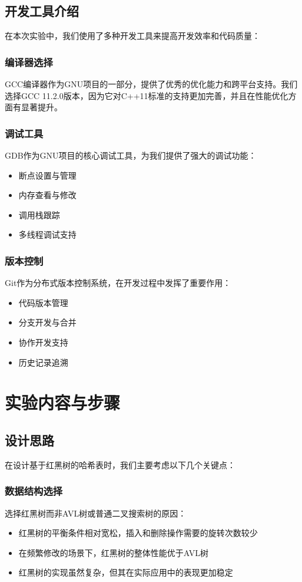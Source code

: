\documentclass[12pt,a4paper]{article}
\begin{document}
\subsection{开发工具介绍}
在本次实验中，我们使用了多种开发工具来提高开发效率和代码质量：

\subsubsection{编译器选择}
GCC编译器作为GNU项目的一部分，提供了优秀的优化能力和跨平台支持。我们选择GCC 11.2.0版本，因为它对C++11标准的支持更加完善，并且在性能优化方面有显著提升。

\subsubsection{调试工具}
GDB作为GNU项目的核心调试工具，为我们提供了强大的调试功能：
\begin{itemize}
\item 断点设置与管理
\item 内存查看与修改
\item 调用栈跟踪
\item 多线程调试支持
\end{itemize}

\subsubsection{版本控制}
Git作为分布式版本控制系统，在开发过程中发挥了重要作用：
\begin{itemize}
\item 代码版本管理
\item 分支开发与合并
\item 协作开发支持
\item 历史记录追溯
\end{itemize}

\section{实验内容与步骤}

\subsection{设计思路}
在设计基于红黑树的哈希表时，我们主要考虑以下几个关键点：

\subsubsection{数据结构选择}
选择红黑树而非AVL树或普通二叉搜索树的原因：
\begin{itemize}
\item 红黑树的平衡条件相对宽松，插入和删除操作需要的旋转次数较少
\item 在频繁修改的场景下，红黑树的整体性能优于AVL树
\item 红黑树的实现虽然复杂，但其在实际应用中的表现更加稳定
\end{itemize}
\end{document}
